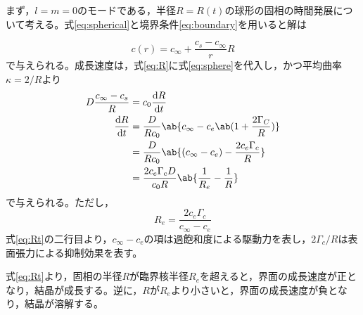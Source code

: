 \documentclass[autodetect-engine,dvi=dvipdfmx,a4paper,ja=standard,oneside,openany,11pt]{bxjsbook}
\begin{document}
まず，$l=m=0$のモードである，半径$R=R(t)$の球形の固相の時間発展について考える。式\eqref{eq:spherical}と境界条件\eqref{eq:boundary}を用いると解は

\begin{equation}
  c(r) = c_{\infty} + \frac{c_s-c_{\infty}}{r}R
  \label{eq:sphere}
\end{equation}
で与えられる。成長速度は，式\eqref{eq:R}に式\eqref{eq:sphere}を代入し，かつ平均曲率$\kappa=2/R$より
\begin{equation}
  \begin{split}
    D\frac{c_\infty-c_s}{R} & =c_0\odv{R}{t}                                                 \\
    \odv{R}{t}              & = \frac{D}{Rc_0}\ab\{c_\infty-c_e\ab(1+\frac{2\Gamma_C}{R})\}  \\
                            & = \frac{D}{R c_0}\ab\{(c_\infty-c_e)-\frac{2c_e\Gamma_c}{R}\}  \\
                            & = \frac{2c_e\Gamma_c D}{c_0 R}\ab\{\frac{1}{R_e}-\frac{1}{R}\}
  \end{split}
  \label{eq:Rt}
\end{equation}
で与えられる。ただし，
\begin{equation}
  R_e = \frac{2c_e \Gamma_c }{c_\infty-c_e}
  \label{eq:Re}
\end{equation}
式\eqref{eq:Rt}の二行目より，$c_\infty-c_e$の項は過飽和度による駆動力を表し，$2\Gamma_c/R$は表面張力による抑制効果を表す。

式\eqref{eq:Rt}より，固相の半径$R$が臨界核半径$R_e$を超えると，界面の成長速度が正となり，結晶が成長する。逆に，$R$が$R_e$より小さいと，界面の成長速度が負となり，結晶が溶解する。
\end{document}
